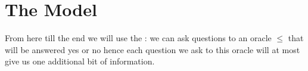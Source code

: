 \section{The Model}
\label{tree:sorting:model}

From here till the end we will use the  : we can ask questions to an oracle $\le$ that will be answered yes or no hence each question we ask to this oracle will at most give us one additional bit of information.
